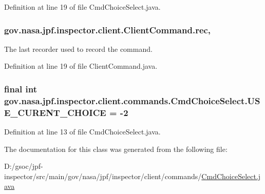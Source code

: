 Definition at line 19 of file Cmd\+Choice\+Select.\+java.

\subsubsection[{\texorpdfstring{rec}{rec}}]{ gov.\+nasa.\+jpf.\+inspector.\+client.\+Client\+Command.\+rec\hspace{0.3cm}{\ttfamily [protected]}, {\ttfamily [inherited]}}\hypertarget{classgov_1_1nasa_1_1jpf_1_1inspector_1_1client_1_1_client_command_af4246f2427035c72a6af45a2c61361f7}{}\label{classgov_1_1nasa_1_1jpf_1_1inspector_1_1client_1_1_client_command_af4246f2427035c72a6af45a2c61361f7}


The last recorder used to record the command. 



Definition at line 19 of file Client\+Command.\+java.

\subsubsection[{\texorpdfstring{U\+S\+E\+\_\+\+C\+U\+R\+E\+N\+T\+\_\+\+C\+H\+O\+I\+CE}{USE_CURENT_CHOICE}}]{\setlength{\rightskip}{0pt plus 5cm}final int gov.\+nasa.\+jpf.\+inspector.\+client.\+commands.\+Cmd\+Choice\+Select.\+U\+S\+E\+\_\+\+C\+U\+R\+E\+N\+T\+\_\+\+C\+H\+O\+I\+CE = -\/2\hspace{0.3cm}{\ttfamily [static]}}\hypertarget{classgov_1_1nasa_1_1jpf_1_1inspector_1_1client_1_1commands_1_1_cmd_choice_select_a0b120ead5754a831aeb7021179e9ab9f}{}\label{classgov_1_1nasa_1_1jpf_1_1inspector_1_1client_1_1commands_1_1_cmd_choice_select_a0b120ead5754a831aeb7021179e9ab9f}


Definition at line 13 of file Cmd\+Choice\+Select.\+java.



The documentation for this class was generated from the following file\+:\begin{DoxyCompactItemize}
\item 
D\+:/gsoc/jpf-\/inspector/src/main/gov/nasa/jpf/inspector/client/commands/\hyperlink{_cmd_choice_select_8java}{Cmd\+Choice\+Select.\+java}\end{DoxyCompactItemize}
